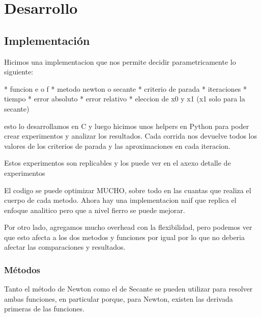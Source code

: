 \section{Desarrollo}

\subsection{Implementación}

Hicimos una implementacion que nos permite decidir parametricamente lo siguiente:

* funcion e o f
* metodo newton o secante
* criterio de parada
  * iteraciones
  * tiempo
  * error absoluto
  * error relativo
* eleccion de x0 y x1 (x1 solo para la secante)

esto lo desarrollamos en C y luego hicimos unos helpers en Python para poder
crear experimentos y analizar los resultados. Cada corrida nos devuelve todos
los valores de los criterios de parada y las aproximaciones en cada iteracion.

Estos experimentos son replicables y los puede ver en el axexo {detalle de experimentos}

El codigo se puede optimizar MUCHO, sobre todo en las cuantas que realiza el
cuerpo de cada metodo. Ahora hay una implementacion naif que replica el enfoque
analitico pero que a nivel fierro se puede mejorar.

Por otro lado, agregamos mucho overhead con la flexibilidad, pero podemos ver
que esto afecta a los dos metodos y funciones por igual por lo que no deberia
afectar las comparaciones y resultados.

\subsubsection{Métodos}
Tanto el método de Newton como el de Secante se pueden utilizar para resolver ambas funciones,
en particular porque, para Newton, existen las derivada primeras de las funciones.

